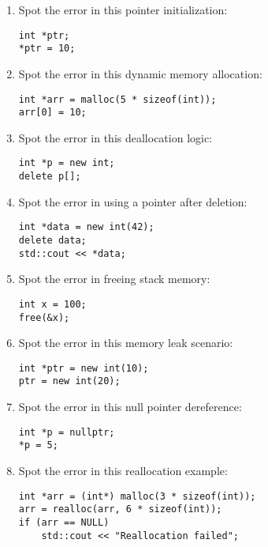 \documentclass[a4paper,12pt]{article}
\begin{document}
\begin{enumerate}
    \item Spot the error in this pointer initialization:
\begin{lstlisting}
int *ptr;
*ptr = 10;
\end{lstlisting}

    \item Spot the error in this dynamic memory allocation:
\begin{lstlisting}
int *arr = malloc(5 * sizeof(int));
arr[0] = 10;
\end{lstlisting}

    \item Spot the error in this deallocation logic:
\begin{lstlisting}
int *p = new int;
delete p[];
\end{lstlisting}

    \item Spot the error in using a pointer after deletion:
\begin{lstlisting}
int *data = new int(42);
delete data;
std::cout << *data;
\end{lstlisting}

    \item Spot the error in freeing stack memory:
\begin{lstlisting}
int x = 100;
free(&x);
\end{lstlisting}

    \item Spot the error in this memory leak scenario:
\begin{lstlisting}
int *ptr = new int(10);
ptr = new int(20);
\end{lstlisting}

    \item Spot the error in this null pointer dereference:
\begin{lstlisting}
int *p = nullptr;
*p = 5;
\end{lstlisting}

    \item Spot the error in this reallocation example:
\begin{lstlisting}
int *arr = (int*) malloc(3 * sizeof(int));
arr = realloc(arr, 6 * sizeof(int));
if (arr == NULL)
    std::cout << "Reallocation failed";
\end{lstlisting}
\end{enumerate}
\end{document}
